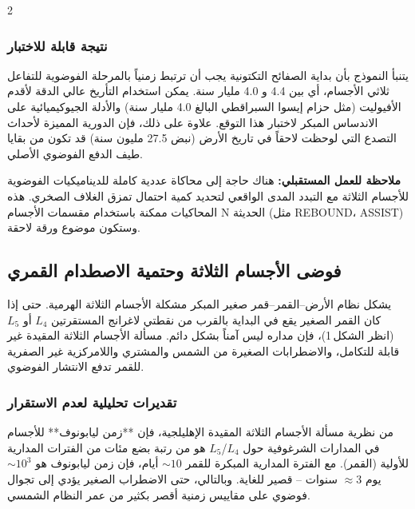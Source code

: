 \documentclass[11pt,a4paper]{article}
\begin{document}
\begin{multicols}{2}
		\subsubsection{نتيجة قابلة للاختبار}
		يتنبأ النموذج بأن بداية الصفائح التكتونية يجب أن ترتبط زمنياً بالمرحلة الفوضوية للتفاعل ثلاثي الأجسام، أي بين 4.4 و 4.0 مليار سنة. يمكن استخدام التأريخ عالي الدقة لأقدم الأفيوليت (مثل حزام إيسوا السبراقطي البالغ 4.0 مليار سنة) والأدلة الجيوكيميائية على الاندساس المبكر لاختبار هذا التوقع. علاوة على ذلك، فإن الدورية المميزة لأحداث التصدع التي لوحظت لاحقاً في تاريخ الأرض (نبض 27.5 مليون سنة) قد تكون من بقايا طيف الدفع الفوضوي الأصلي.
		
		\vspace{0.2cm}
		\noindent
		\textbf{ملاحظة للعمل المستقبلي:} هناك حاجة إلى محاكاة عددية كاملة للديناميكيات الفوضوية للأجسام الثلاثة مع التبدد المدى الواقعي لتحديد كمية احتمال تمزق الغلاف الصخري. هذه المحاكيات ممكنة باستخدام مقسمات الأجسام N الحديثة (مثل REBOUND، ASSIST) وستكون موضوع ورقة لاحقة.
		
		\subsection{فوضى الأجسام الثلاثة وحتمية الاصطدام القمري}
		يشكل نظام الأرض–القمر–قمر صغير المبكر مشكلة الأجسام الثلاثة الهرمية. حتى إذا كان القمر الصغير يقع في البداية بالقرب من نقطتي لاغرانج المستقرتين \(L_4\) أو \(L_5\) (انظر الشكل 1)، فإن مداره ليس آمناً بشكل دائم. مسألة الأجسام الثلاثة المقيدة غير قابلة للتكامل، والاضطرابات الصغيرة من الشمس والمشتري واللامركزية غير الصفرية للقمر تدفع الانتشار الفوضوي.
		
		\subsubsection{تقديرات تحليلية لعدم الاستقرار}
		من نظرية مسألة الأجسام الثلاثة المقيدة الإهليلجية، فإن **زمن ليابونوف** للأجسام في المدارات الشرغوفية حول \(L_4\)/\(L_5\) هو من رتبة بضع مئات من الفترات المدارية للأولية (القمر). مع الفترة المدارية المبكرة للقمر \(\sim 10\) أيام، فإن زمن ليابونوف هو \(\sim 10^{3}\) يوم \(\approx 3\) سنوات – قصير للغاية. وبالتالي، حتى الاضطراب الصغير يؤدي إلى تجوال فوضوي على مقاييس زمنية أقصر بكثير من عمر النظام الشمسي.
		

\end{multicols}
\end{document}
